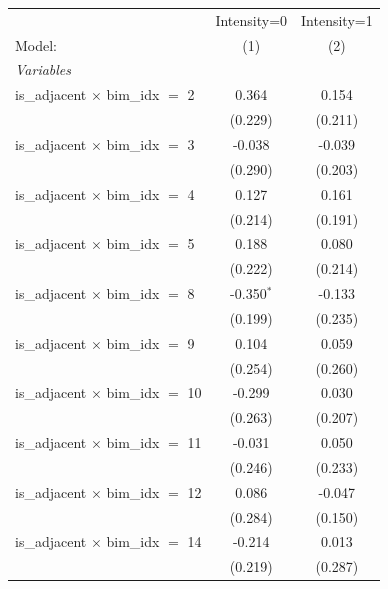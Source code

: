 
\begingroup
\centering
\begin{tabular}{lcc}
   \tabularnewline \midrule \midrule
                                            & Intensity=0   & Intensity=1 \\   
   Model:                                   & (1)           & (2)\\  
   \midrule
   \emph{Variables}\\
   is\_adjacent $\times$ bim\_idx $=$ 2     & 0.364         & 0.154\\   
                                            & (0.229)       & (0.211)\\   
   is\_adjacent $\times$ bim\_idx $=$ 3     & -0.038        & -0.039\\   
                                            & (0.290)       & (0.203)\\   
   is\_adjacent $\times$ bim\_idx $=$ 4     & 0.127         & 0.161\\   
                                            & (0.214)       & (0.191)\\   
   is\_adjacent $\times$ bim\_idx $=$ 5     & 0.188         & 0.080\\   
                                            & (0.222)       & (0.214)\\   
   is\_adjacent $\times$ bim\_idx $=$ 8     & -0.350$^{*}$  & -0.133\\   
                                            & (0.199)       & (0.235)\\   
   is\_adjacent $\times$ bim\_idx $=$ 9     & 0.104         & 0.059\\   
                                            & (0.254)       & (0.260)\\   
   is\_adjacent $\times$ bim\_idx $=$ 10    & -0.299        & 0.030\\   
                                            & (0.263)       & (0.207)\\   
   is\_adjacent $\times$ bim\_idx $=$ 11    & -0.031        & 0.050\\   
                                            & (0.246)       & (0.233)\\   
   is\_adjacent $\times$ bim\_idx $=$ 12    & 0.086         & -0.047\\   
                                            & (0.284)       & (0.150)\\   
   is\_adjacent $\times$ bim\_idx $=$ 14    & -0.214        & 0.013\\   
                                            & (0.219)       & (0.287)\\   

\end{tabular}
